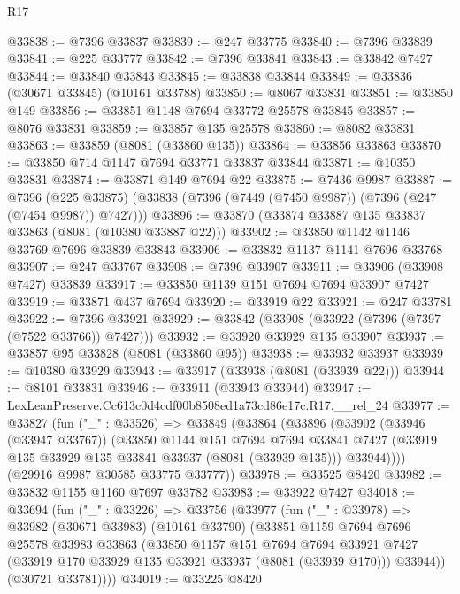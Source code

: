\begin{lexlean}{R17}
\begin{coremodule}
@33838 := @7396 @33837
@33839 := @247 @33775
@33840 := @7396 @33839
@33841 := @225 @33777
@33842 := @7396 @33841
@33843 := @33842 @7427
@33844 := @33840 @33843
@33845 := @33838 @33844
@33849 := @33836 (@30671 @33845) (@10161 @33788)
@33850 := @8067 @33831
@33851 := @33850 @149
@33856 := @33851 @1148 @7694 @33772 @25578 @33845
@33857 := @8076 @33831
@33859 := @33857 @135 @25578
@33860 := @8082 @33831
@33863 := @33859 (@8081 (@33860 @135))
@33864 := @33856 @33863
@33870 := @33850 @714 @1147 @7694 @33771 @33837 @33844
@33871 := @10350 @33831
@33874 := @33871 @149 @7694 @22
@33875 := @7436 @9987
@33887 := @7396
    (@225 @33875)
    (@33838 (@7396 (@7449 (@7450 @9987)) (@7396 (@247 (@7454 @9987)) @7427)))
@33896 := @33870 (@33874 @33887 @135 @33837 @33863 (@8081 (@10380 @33887 @22)))
@33902 := @33850 @1142 @1146 @33769 @7696 @33839 @33843
@33906 := @33832 @1137 @1141 @7696 @33768
@33907 := @247 @33767
@33908 := @7396 @33907
@33911 := @33906 (@33908 @7427) @33839
@33917 := @33850 @1139 @151 @7694 @7694 @33907 @7427
@33919 := @33871 @437 @7694
@33920 := @33919 @22
@33921 := @247 @33781
@33922 := @7396 @33921
@33929 := @33842 (@33908 (@33922 (@7396 (@7397 (@7522 @33766)) @7427)))
@33932 := @33920 @33929 @135 @33907
@33937 := @33857 @95 @33828 (@8081 (@33860 @95))
@33938 := @33932 @33937
@33939 := @10380 @33929
@33943 := @33917 (@33938 (@8081 (@33939 @22)))
@33944 := @8101 @33831
@33946 := @33911 (@33943 @33944)
@33947 := LexLeanPreserve.Cc613c0d4cdf00b8508ed1a73cd86e17c.R17.__rel_24
@33977 := @33827
    (fun ("_" : @33526) =>
    @33849
      (@33864
        (@33896
          (@33902
            (@33946 (@33947 @33767))
            (@33850
              @1144
              @151
              @7694
              @7694
              @33841
              @7427
              (@33919 @135 @33929 @135 @33841 @33937 (@8081 (@33939 @135)))
              @33944))))
      (@29916 @9987 @30585 @33775 @33777))
@33978 := @33525 @8420
@33982 := @33832 @1155 @1160 @7697 @33782
@33983 := @33922 @7427
@34018 := @33694
    (fun ("_" : @33226) =>
    @33756
      (@33977
        (fun ("_" : @33978) =>
        @33982
          (@30671 @33983)
          (@10161 @33790)
          (@33851
            @1159
            @7694
            @7696
            @25578
            @33983
            @33863
            (@33850
              @1157
              @151
              @7694
              @7694
              @33921
              @7427
              (@33919 @170 @33929 @135 @33921 @33937 (@8081 (@33939 @170)))
              @33944))
          (@30721 @33781))))
@34019 := @33225 @8420

\end{coremodule}
\end{lexlean}
